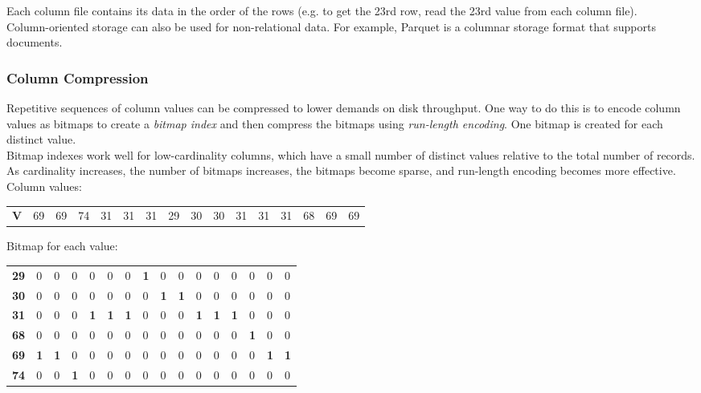 \documentclass[12pt, titlepage]{article}
\begin{document}
Each column file contains its data in the order of the rows (e.g. to get the 23rd row, read the 23rd value from each column file). \\

Column-oriented storage can also be used for non-relational data. For example, Parquet is a columnar storage format that supports documents.

\subsubsection{Column Compression}

Repetitive sequences of column values can be compressed to lower demands on disk throughput. One way to do this is to encode column values as bitmaps to create a \textit{bitmap index} and then compress the bitmaps using \textit{run-length encoding}. One bitmap is created for each distinct value. \\

Bitmap indexes work well for low-cardinality columns, which have a small number of distinct values relative to the total number of records. As cardinality increases, the number of bitmaps increases, the bitmaps become sparse, and run-length encoding becomes more effective. \\

Column values: \\[-7mm]
\begin{table}[H]
    \centering
    \begin{tabular}{C{5mm}|*{15}{C{4.2mm}|}}
        \textbf{V} & 69 & 69 & 74 & 31 & 31 & 31 & 29 & 30 & 30 & 31 & 31 & 31 & 68 & 69 & 69 \\
    \end{tabular}
\end{table}

Bitmap for each value: \\[-7mm]
\begin{table}[H]
    \centering
    \begin{tabular}{C{5mm}|*{15}{C{4.2mm}|}}
        \textbf{29} & 0 & 0 & 0 & 0 & 0 & 0 & \textbf{1} & 0 & 0 & 0 & 0 & 0 & 0 & 0 & 0 \\
        \textbf{30} & 0 & 0 & 0 & 0 & 0 & 0 & 0 & \textbf{1} & \textbf{1} & 0 & 0 & 0 & 0 & 0 & 0 \\
        \textbf{3\textbf{1}} & 0 & 0 & 0 & \textbf{1} & \textbf{1} & \textbf{1} & 0 & 0 & 0 & \textbf{1} & \textbf{1} & \textbf{1} & 0 & 0 & 0 \\
        \textbf{68} & 0 & 0 & 0 & 0 & 0 & 0 & 0 & 0 & 0 & 0 & 0 & 0 & \textbf{1} & 0 & 0 \\
        \textbf{69} & \textbf{1} & \textbf{1} & 0 & 0 & 0 & 0 & 0 & 0 & 0 & 0 & 0 & 0 & 0 & \textbf{1} & \textbf{1} \\
        \textbf{74} & 0 & 0 & \textbf{1} & 0 & 0 & 0 & 0 & 0 & 0 & 0 & 0 & 0 & 0 & 0 & 0 \\
    \end{tabular}
\end{table}
\end{document}
